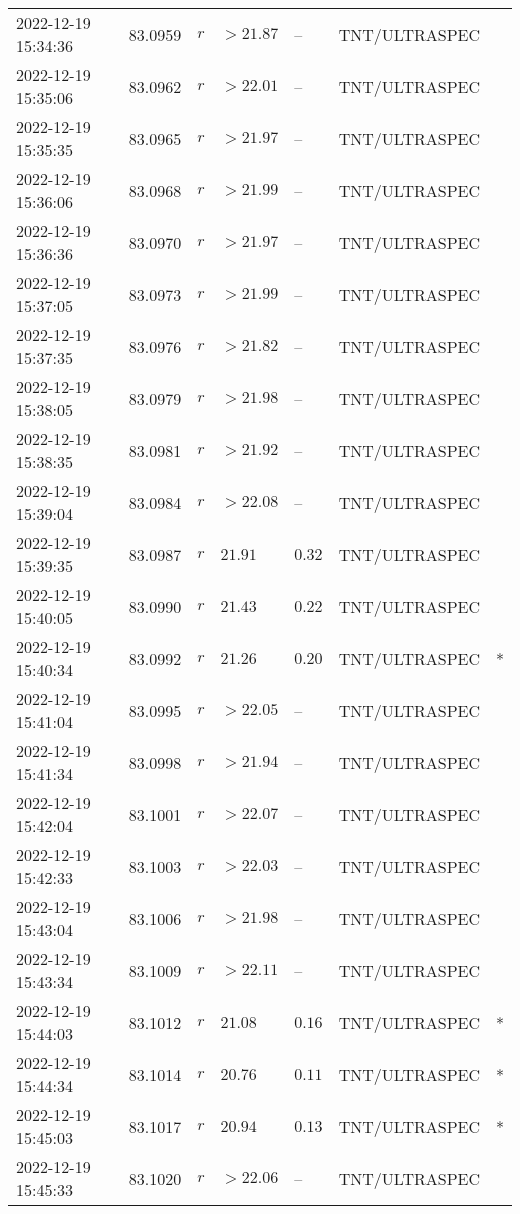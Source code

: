 \documentclass{nature_plusfigure}
\begin{document}
\begin{supplement}
\begin{center}
\begin{longtable}{lllllll}
2022-12-19 15:34:36 & 83.0959 & $r$ & $>21.87$ & -- & TNT/ULTRASPEC &  \\ 
2022-12-19 15:35:06 & 83.0962 & $r$ & $>22.01$ & -- & TNT/ULTRASPEC &  \\ 
2022-12-19 15:35:35 & 83.0965 & $r$ & $>21.97$ & -- & TNT/ULTRASPEC &  \\ 
2022-12-19 15:36:06 & 83.0968 & $r$ & $>21.99$ & -- & TNT/ULTRASPEC &  \\ 
2022-12-19 15:36:36 & 83.0970 & $r$ & $>21.97$ & -- & TNT/ULTRASPEC &  \\ 
2022-12-19 15:37:05 & 83.0973 & $r$ & $>21.99$ & -- & TNT/ULTRASPEC &  \\ 
2022-12-19 15:37:35 & 83.0976 & $r$ & $>21.82$ & -- & TNT/ULTRASPEC &  \\ 
2022-12-19 15:38:05 & 83.0979 & $r$ & $>21.98$ & -- & TNT/ULTRASPEC &  \\ 
2022-12-19 15:38:35 & 83.0981 & $r$ & $>21.92$ & -- & TNT/ULTRASPEC &  \\ 
2022-12-19 15:39:04 & 83.0984 & $r$ & $>22.08$ & -- & TNT/ULTRASPEC &  \\ 
2022-12-19 15:39:35 & 83.0987 & $r$ & $21.91$ & $0.32$ & TNT/ULTRASPEC &  \\ 
2022-12-19 15:40:05 & 83.0990 & $r$ & $21.43$ & $0.22$ & TNT/ULTRASPEC &  \\ 
2022-12-19 15:40:34 & 83.0992 & $r$ & $21.26$ & $0.20$ & TNT/ULTRASPEC & * \\ 
2022-12-19 15:41:04 & 83.0995 & $r$ & $>22.05$ & -- & TNT/ULTRASPEC &  \\ 
2022-12-19 15:41:34 & 83.0998 & $r$ & $>21.94$ & -- & TNT/ULTRASPEC &  \\ 
2022-12-19 15:42:04 & 83.1001 & $r$ & $>22.07$ & -- & TNT/ULTRASPEC &  \\ 
2022-12-19 15:42:33 & 83.1003 & $r$ & $>22.03$ & -- & TNT/ULTRASPEC &  \\ 
2022-12-19 15:43:04 & 83.1006 & $r$ & $>21.98$ & -- & TNT/ULTRASPEC &  \\ 
2022-12-19 15:43:34 & 83.1009 & $r$ & $>22.11$ & -- & TNT/ULTRASPEC &  \\ 
2022-12-19 15:44:03 & 83.1012 & $r$ & $21.08$ & $0.16$ & TNT/ULTRASPEC & * \\ 
2022-12-19 15:44:34 & 83.1014 & $r$ & $20.76$ & $0.11$ & TNT/ULTRASPEC & * \\ 
2022-12-19 15:45:03 & 83.1017 & $r$ & $20.94$ & $0.13$ & TNT/ULTRASPEC & * \\ 
2022-12-19 15:45:33 & 83.1020 & $r$ & $>22.06$ & -- & TNT/ULTRASPEC &  \\ 

\end{longtable}
\end{center}
\end{supplement}
\end{document}
